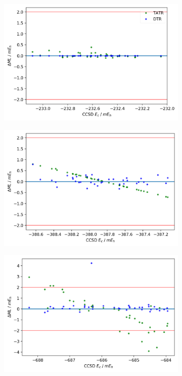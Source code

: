 \begin{figure}
    \begin{subfigure}{.5\textwidth}
        \centering
        \includegraphics[scale=.55]{p2/figures/H2O_energy.png}
        \caption{}
        \label{fig:H2O}
    \end{subfigure}%
    \begin{subfigure}{.5\textwidth}
        \centering
        \includegraphics[scale=.55]{p2/figures/CH3OH_energy.png}
        \caption{}
        \label{fig:CH3OH}
    \end{subfigure}
    \begin{subfigure}{.5\textwidth}
        \centering
        \includegraphics[scale=.55]{p2/figures/metox_energy.png}

\end{subfigure}
\end{figure}
